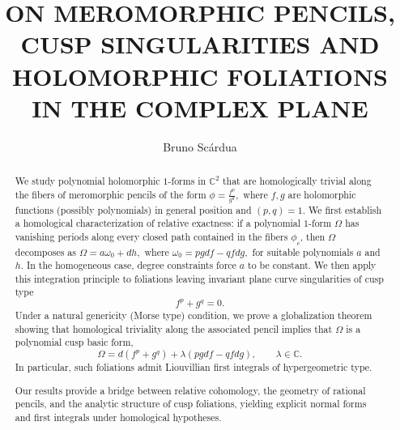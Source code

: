 \documentclass[11pt,a4paper]{amsart}
\title[ON MEROMORPHIC PENCILS, CUSP SINGULARITIES AND HOLOMORPHIC FOLIATIONS]{ON MEROMORPHIC PENCILS, CUSP SINGULARITIES AND HOLOMORPHIC FOLIATIONS IN THE COMPLEX PLANE}
\author{Bruno Scárdua}
\date{}
\date{}
\theoremstyle{definition}
\begin{document}
\maketitle







\begin{abstract}

We study polynomial holomorphic $1$-forms in $\mathbb{C}^2$ that are homologically trivial along the fibers of meromorphic pencils of the form
$
\phi = \frac{f^p}{g^q},
$
where $f,g$ are holomorphic functions (possibly  polynomials) in general position and $(p,q)=1$.
We first establish a homological characterization of relative exactness: if a polynomial $1$-form $\Omega$ has vanishing periods along every closed path contained in the fibers $\phi_c$, then $\Omega$ decomposes as
$\Omega = a\omega_0 + dh,$ where $\omega_0 = p gdf - q f dg,$
for suitable polynomials $a$ and $h$. In the homogeneous case, degree constraints force $a$ to be constant.
We then apply this integration principle to foliations leaving invariant plane curve singularities of cusp type
\[
f^p + g^q = 0.
\]
Under a natural genericity (Morse type) condition, we prove a globalization theorem showing that homological triviality along the associated pencil implies that $\Omega$ is a polynomial cusp basic form,
\[
\Omega = d(f^p + g^q) + \lambda (p gdf - q fdg),
\qquad \lambda \in \mathbb{C}.
\]
In particular, such foliations admit Liouvillian first integrals of hypergeometric type.

Our results provide a bridge between relative cohomology, the geometry of rational pencils, and the analytic structure of cusp foliations, yielding explicit normal forms and first integrals under homological hypotheses.
\end{abstract}






\tableofcontents
\end{document}
